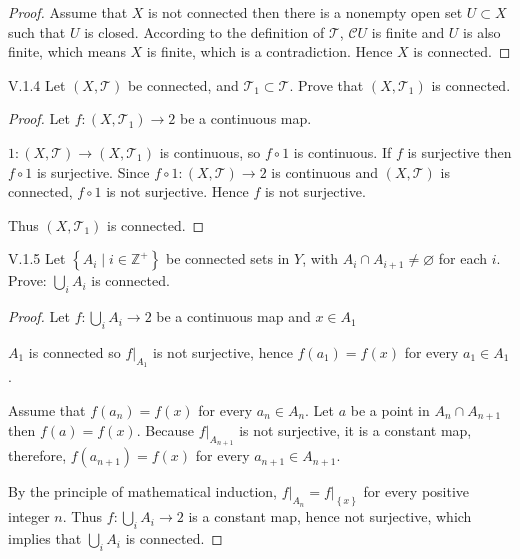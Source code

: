 \begin{proof}
	Assume that \( X \) is not connected then there is a nonempty open set \( U \subset X \) such that \( U \) is closed. According to the definition of \( \mathscr{T} \), \( \mathscr{C}U \) is finite and \( U \) is also finite, which means \( X \) is finite, which is a contradiction. Hence \( X \) is connected.
\end{proof}

\begin{problem}{V.1.4}
Let \( (X, \mathscr{T}) \) be connected, and \( \mathscr{T}_{1} \subset \mathscr{T} \). Prove that \( (X, \mathscr{T}_{1}) \) is connected.
\end{problem}

\begin{proof}
	Let \( f: (X, \mathscr{T}_{1}) \to 2 \) be a continuous map.

	\( 1: (X, \mathscr{T}) \to (X, \mathscr{T}_{1}) \) is continuous, so \( f \circ 1 \) is continuous. If \( f \) is surjective then \( f \circ 1 \) is surjective. Since \( f \circ 1: (X, \mathscr{T}) \to 2 \) is continuous and \( (X, \mathscr{T}) \) is connected, \( f \circ 1 \) is not surjective. Hence \( f \) is not surjective.

	Thus \( (X, \mathscr{T}_{1}) \) is connected.
\end{proof}

\begin{problem}{V.1.5}
Let \( \left\{ A_{i} \mid i \in \mathbb{Z}^{+} \right\} \) be connected sets in \( Y \), with \( A_{i} \cap A_{i+1} \ne \varnothing \) for each \(i\). Prove: \( \bigcup_{i} A_{i} \) is connected.
\end{problem}

\begin{proof}
	Let \( f: \bigcup_{i} A_{i} \to 2 \) be a continuous map and \( x \in A_{1} \)

	\( A_{1} \) is connected so \( f\vert_{A_{1}} \) is not surjective, hence \( f(a_{1}) = f(x) \) for every \( a_{1} \in A_{1} \).

	Assume that \( f(a_{n}) = f(x) \) for every \( a_{n} \in A_{n} \). Let \( a \) be a point in \( A_{n} \cap A_{n+1} \) then \( f(a) = f(x) \). Because \( f\vert_{A_{n+1}} \) is not surjective, it is a constant map, therefore, \( f(a_{n+1}) = f(x) \) for every \( a_{n+1} \in A_{n+1} \).

	By the principle of mathematical induction, \( f\vert_{A_{n}} = f\vert_{\left\{x\right\}} \) for every positive integer \( n \). Thus \( f: \bigcup_{i} A_{i} \to 2 \) is a constant map, hence not surjective, which implies that \( \bigcup_{i} A_{i} \) is connected.
\end{proof}

